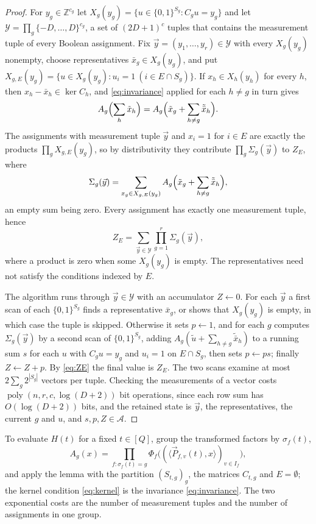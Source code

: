 \documentclass[11pt,reqno]{amsart}
\numberwithin{equation}{section}
\theoremstyle{plain}
\theoremstyle{definition}
\theoremstyle{remark}
\DeclareMathOperator{\poly}{poly}
\newcommand{\A}{\mathcal{A}}
\newcommand{\Z}{\mathbb{Z}}
\newcommand{\PP}{\vec{P}}
\newcommand{\ip}[2]{\langle #1,#2\rangle}
\begin{document}
\begin{proof}
For $y_g\in\Z^{c_g}$ let $X_g(y_g)=\{u\in\{0,1\}^{S_g}:C_gu=y_g\}$ and let
$\mathcal Y=\prod_g\{-D,\dots,D\}^{c_g}$, a set of $(2D+1)^{c}$ tuples that
contains the measurement tuple of every Boolean assignment. Fix
$\vec y=(y_1,\dots,y_r)\in\mathcal Y$ with every $X_g(y_g)$ nonempty, choose
representatives $\bar x_g\in X_g(y_g)$, and put
$X_{g,E}(y_g)=\{u\in X_g(y_g):u_i=1\ (i\in E\cap S_g)\}$. If $x_h\in X_h(y_h)$
for every $h$, then $x_h-\bar x_h\in\ker C_h$, and \eqref{eq:invariance} applied
for each $h\ne g$ in turn gives
\[
  A_g\Bigl(\sum_{h}\tilde x_h\Bigr)=A_g\Bigl(\tilde x_g+\sum_{h\ne g}\tilde{\bar x}_h\Bigr).
\]
The assignments with measurement tuple $\vec y$ and $x_i=1$ for $i\in E$ are
exactly the products $\prod_gX_{g,E}(y_g)$, so by distributivity they contribute
$\prod_g\Sigma_g(\vec y)$ to $Z_E$, where
\begin{equation}\label{eq:Sigma}
  \Sigma_g(\vec y)=\sum_{x_g\in X_{g,E}(y_g)}A_g\Bigl(\tilde x_g+\sum_{h\ne g}\tilde{\bar x}_h\Bigr),
\end{equation}
an empty sum being zero. Every assignment has exactly one measurement tuple, hence
\begin{equation}\label{eq:ZE}
  Z_E=\sum_{\vec y\in\mathcal Y}\prod_{g=1}^{r}\Sigma_g(\vec y),
\end{equation}
where a product is zero when some $X_g(y_g)$ is empty. The representatives need
not satisfy the conditions indexed by $E$.

The algorithm runs through $\vec y\in\mathcal Y$ with an accumulator $Z\leftarrow 0$.
For each $\vec y$ a first scan of each $\{0,1\}^{S_g}$ finds a representative
$\bar x_g$, or shows that $X_g(y_g)$ is empty, in which case the tuple is skipped.
Otherwise it sets $p\leftarrow 1$, and for each $g$ computes $\Sigma_g(\vec y)$ by a
second scan of $\{0,1\}^{S_g}$, adding $A_g(\tilde u+\sum_{h\ne g}\tilde{\bar x}_h)$
to a running sum $s$ for each $u$ with $C_gu=y_g$ and $u_i=1$ on $E\cap S_g$,
then sets $p\leftarrow ps$; finally $Z\leftarrow Z+p$. By \eqref{eq:ZE} the final
value is $Z_E$. The two scans examine at most $2\sum_g2^{|S_g|}$ vectors per
tuple. Checking the measurements of a vector costs $\poly(n,r,c,\log(D+2))$
bit operations, since each row sum has $O(\log(D+2))$ bits, and the retained
state is $\vec y$, the representatives, the current $g$ and $u$, and $s,p,Z\in\A$.
\end{proof}

To evaluate $H(t)$ for a fixed $t\in[Q]$, group the transformed factors by
$\sigma_f(t)$,
\[
  A_g(x)=\prod_{f:\sigma_f(t)=g}\Phi_f\bigl((\ip{\PP_{f,v}(t)}{x})_{v\in I_f}\bigr),
\]
and apply the lemma with the partition $(S_{t,g})_g$, the matrices $C_{t,g}$ and
$E=\emptyset$; the kernel condition \eqref{eq:kernel} is the invariance
\eqref{eq:invariance}. The two exponential costs are the number of measurement
tuples and the number of assignments in one group.
\end{document}
